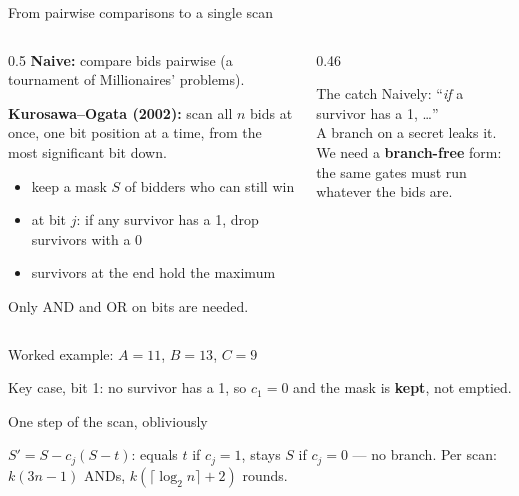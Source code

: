 \documentclass[aspectratio=169,11pt]{beamer}
\newcommand{\diagram}[2][\linewidth]{\resizebox{#1}{!}{}}
\begin{document}
\begin{frame}{From pairwise comparisons to a single scan}
  \begin{columns}[c]
    \begin{column}{0.5\textwidth}
      \textbf{Naive:} compare bids pairwise (a tournament of Millionaires' problems).
      \medskip

      \textbf{Kurosawa--Ogata (2002):} scan all $n$ bids at once, \alert{one bit position at a
      time}, from the most significant bit down.
      \begin{itemize}
        \item keep a mask $S$ of bidders who can still win
        \item at bit $j$: if any survivor has a 1, drop survivors with a 0
        \item survivors at the end hold the maximum
      \end{itemize}
      Only AND and OR on bits are needed.
    \end{column}
    \begin{column}{0.46\textwidth}
      \begin{alertblock}{The catch}
        Naively: ``\emph{if} a survivor has a 1, \ldots''\\
        A branch on a secret leaks it.\\[4pt]
        We need a \textbf{branch-free} form: the same gates must run whatever the bids are.
      \end{alertblock}
    \end{column}
  \end{columns}
\end{frame}

\begin{frame}{Worked example: $A = 11$, $B = 13$, $C = 9$}
  \centering
  \diagram[0.82\linewidth]{worked_example}
  \medskip

  \small Key case, bit 1: no survivor has a 1, so $c_1 = 0$ and the mask is \textbf{kept}, not emptied.
\end{frame}

\begin{frame}{One step of the scan, obliviously}
  \centering
  \diagram[0.95\linewidth]{bit_circuit}
  \medskip

  \small $S' = S - c_j(S - t)$: equals $t$ if $c_j = 1$, stays $S$ if $c_j = 0$ --- no branch.
  \quad Per scan: $k(3n-1)$ ANDs, $k(\lceil\log_2 n\rceil + 2)$ rounds.
\end{frame}
\end{document}
